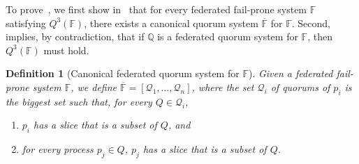 \documentclass[11pt]{article}
\newtheorem{definition}{Definition}
\begin{document}
To prove~, we first show in~ that for every federated fail-prone system $\mathbb{F}$ satisfying $Q^3(\mathbb{F})$, there exists a canonical quorum system $\overline{\mathbb{F}}$ for $\mathbb{F}$. Second,~ implies, by contradiction, that if $\mathbb{Q}$ is a federated quorum system for $\mathbb{F}$, then $Q^3(\mathbb{F})$ must hold.

\begin{definition}[Canonical federated quorum system for $\mathbb{F}$]
  \label{def:canonical}
  Given a federated fail-prone system $\mathbb{F}$, we define $\overline{\mathbb{F}}=\left[\mathcal{Q}_1,...,\mathcal{Q}_n\right]$, where the set $\mathcal{Q}_i$ of quorums of $p_i$ is the biggest set such that, for every $Q\in\mathcal{Q}_i$,
  \begin{enumerate}
    \item $p_i$ has a slice that is a subset of $Q$, and
    \item for every process $p_j\in Q$, $p_j$ has a slice that is a subset of $Q$.
  \end{enumerate}
\end{definition}


\end{document}
